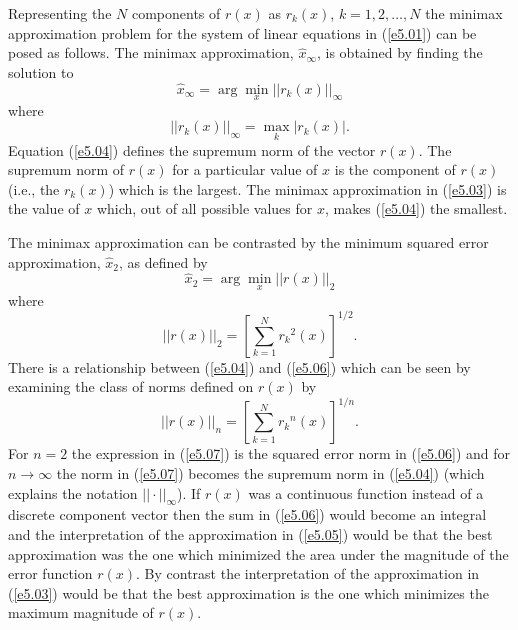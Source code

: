      Representing the $N$ components of $r(x)$ as
$r_k(x)$, $k=1,2,\ldots,N$ the minimax approximation
problem for the system of linear equations in (\ref{e5.01}) can
be posed as follows.  The minimax approximation, $\hat{x}_{\infty}$,
is obtained by finding the solution to
%
\begin{equation}
\hat{x}_{\infty}=\arg\min_x ||r_k(x)||_{\infty}
\label{e5.03}
\end{equation}
%
where
%
\begin{equation}
||r_k(x)||_{\infty}=\max_k |r_k(x)|.
\label{e5.04}
\end{equation}
%
Equation (\ref{e5.04}) defines the supremum norm of the vector 
$r(x)$.  The supremum norm of $r(x)$ for a particular
value of $x$ is the component of $r(x)$ (i.e., the $r_k(x)$)
which is the largest.  The minimax approximation
in (\ref{e5.03}) is the value of $x$ which, out of all possible
values for $x$, makes (\ref{e5.04}) the smallest.

     The minimax approximation can be 
contrasted by the minimum squared error approximation,
$\hat{x}_2$, as defined by
%
\begin{equation}
\hat{x}_2=\arg\min_x ||r(x)||_2
\label{e5.05}
\end{equation}
%
where
%
\begin{equation}
||r(x)||_2=[\sum_{k=1}^{N}{r_k}^2(x)]^{1/2}.
\label{e5.06}
\end{equation}
%
There is a relationship between (\ref{e5.04}) and (\ref{e5.06}) which
can be seen by examining the class of norms defined on $r(x)$ by
%
\begin{equation}
||r(x)||_n=[\sum_{k=1}^{N}{r_k}^n(x)]^{1/n}.
\label{e5.07}
\end{equation}
%
For $n=2$ the expression in (\ref{e5.07}) is the squared error
norm in (\ref{e5.06}) and for $n\rightarrow \infty$ the norm in (\ref{e5.07})
becomes the supremum norm in (\ref{e5.04}) (which explains the 
notation $||\cdot||_{\infty}$).  If
$r(x)$ was a continuous function instead of a discrete
component vector then the sum in (\ref{e5.06}) would become an
integral and the interpretation of the approximation in 
(\ref{e5.05}) would be that
the best approximation was the one which minimized
the area under the magnitude of the error function $r(x)$.
By contrast the interpretation of the approximation in (\ref{e5.03})
would be that the best approximation is the one which minimizes the maximum
magnitude of $r(x)$.


